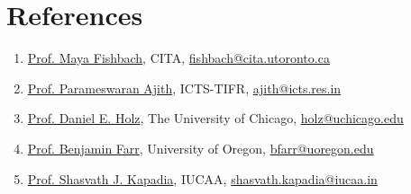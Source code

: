 		
		
		
		
		
		
		
		\section{References}
		\begin{enumerate}
			\item \href{https://mayafishbach.me/}{Prof. Maya Fishbach}, CITA, \href{mailto:fishbach@cita.utoronto.ca}{fishbach@cita.utoronto.ca}
			\item \href{https://www.icts.res.in/people/parameswaran-ajith}{Prof. Parameswaran Ajith}, ICTS-TIFR, \href{mailto:ajith@icts.res.in}{ajith@icts.res.in}
			\item \href{https://physics.uchicago.edu/people/profile/daniel-holz/}{Prof. Daniel E. Holz}, The University of Chicago, \href{mailto:holz@uchicago.edu}{holz@uchicago.edu}
			\item \href{https://cas.uoregon.edu/directory/cas-natural-sciences-faculty/all/bfarr}{Prof. Benjamin Farr}, University of Oregon, \href{mailto:bfarr@uoregon.edu}{bfarr@uoregon.edu}
			\item \href{https://www.iucaa.in/en/faculty-research/shasvath-kapadia}{Prof. Shasvath J. Kapadia}, IUCAA, \href{mailto:shasvath.kapadia@iucaa.in}{shasvath.kapadia@iucaa.in}
		\end{enumerate}
